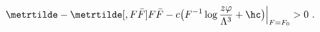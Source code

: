 \begin{equation}
  \label{eq:Fpotconstr2}
  \Bigl. \metrtilde - \metrtilde[, F \bar{F}] F \bar{F} - c \bigl(F^{-1} \log \frac{z \varphi}{\Lambda^3} + \hc
  \bigr) \Bigr|_{F = F_0} > 0\ .
\end{equation}

